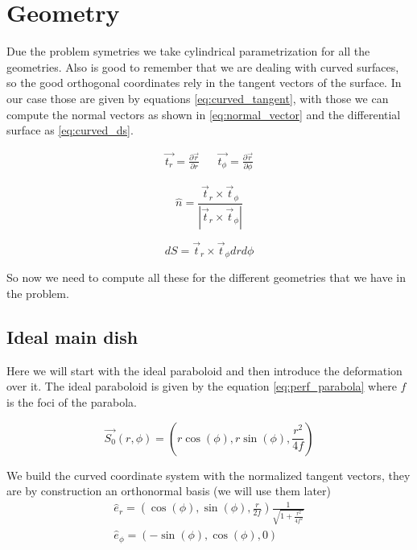\section{Geometry}
Due the problem symetries we take cylindrical parametrization for all the geometries.
Also is good to remember that we are dealing with curved surfaces, so the good orthogonal coordinates rely in the tangent vectors of the surface. In our case those are given by equations \ref{eq:curved_tangent}, with those we can compute the normal vectors as shown in \ref{eq:normal_vector} and the differential surface as \ref{eq:curved_ds}.


\begin{align}
    \vec{t_r} = \frac{\partial \vec{r}}{\partial r} &&  \vec{t_{\phi}} = \frac{\partial \vec{r}}{\partial \phi}
    \label{eq:curved_tangent}
\end{align}

\begin{equation}
    \hat{n} =  \frac{\vec{t}_r \times \vec{t}_{\phi}}{|\vec{t}_r \times \vec{t}_{\phi}|}
    \label{eq:normal_vector}
\end{equation}

\begin{equation}
    dS = \vec{t}_r \times \vec{t}_{\phi}dr d\phi
    \label{eq:curved_ds}
\end{equation}


So now we need to compute all these for the different geometries that we have in the problem.





\subsection{Ideal main dish}
Here we will start with the ideal paraboloid and then introduce the deformation over it.
The ideal paraboloid is given by the equation \ref{eq:perf_parabola} where $f$ is the foci of the parabola.

\begin{equation}
    \vec{S_0}(r, \phi) = \left(r\cos(\phi), r\sin(\phi), \frac{r^2}{4f} \right)
    \label{eq:perf_parabola}
\end{equation}


We build the curved coordinate system with the normalized tangent vectors, they are by construction an orthonormal basis (we will use them later)
\begin{align}
    \hat{e}_{r} = \left( \cos(\phi), \sin(\phi), \frac{r}{2f} \right) \frac{1}{\sqrt{1+\frac{r^2}{4f^2}}} \\
    \hat{e}_{\phi}  = \left(-\sin(\phi), \cos(\phi),0 \right)
\end{align}

